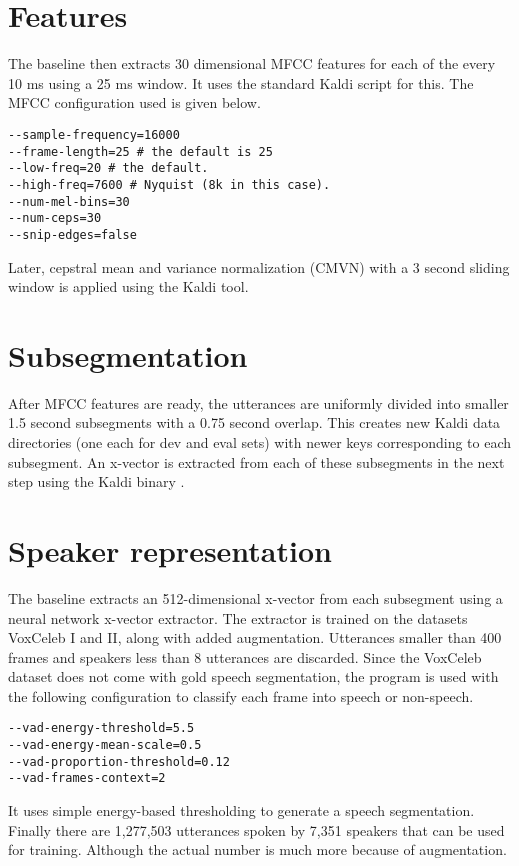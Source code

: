 \section{Features}
The baseline then extracts 30 dimensional MFCC features for each of the every 10 ms using a 25 ms window. It uses the standard  Kaldi script for this. The MFCC configuration used  is given below.

\begin{verbatim}
--sample-frequency=16000
--frame-length=25 # the default is 25
--low-freq=20 # the default.
--high-freq=7600 # Nyquist (8k in this case).
--num-mel-bins=30
--num-ceps=30
--snip-edges=false
\end{verbatim}

Later, cepstral mean and variance normalization (CMVN) with a 3 second sliding window is applied using the  Kaldi tool.

\section{Subsegmentation}
After MFCC features are ready, the utterances are uniformly divided into smaller 1.5 second subsegments with a 0.75 second overlap. This creates new Kaldi data directories (one each for dev and eval sets) with newer keys corresponding to each subsegment. An x-vector is extracted from each of these subsegments in the next step using the Kaldi binary .

\section{Speaker representation}
The baseline extracts an 512-dimensional x-vector from each subsegment using a neural network x-vector extractor. The extractor is trained on the datasets VoxCeleb I and II, along with added augmentation. Utterances smaller than 400 frames and speakers less than 8 utterances are discarded. Since the VoxCeleb dataset does not come with gold speech segmentation, the program  is used with the following configuration to classify each frame into speech or non-speech.

\begin{verbatim}
--vad-energy-threshold=5.5
--vad-energy-mean-scale=0.5
--vad-proportion-threshold=0.12
--vad-frames-context=2
\end{verbatim}

It uses simple energy-based thresholding to generate a speech segmentation. Finally there are 1,277,503 utterances spoken by 7,351 speakers that can be used for training. Although the actual number is much more because of augmentation.

